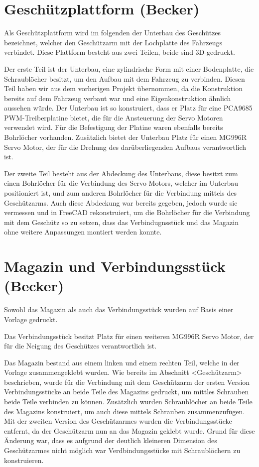 \section{Geschützplattform (Becker)}

Als Geschützplattform wird im folgenden der Unterbau des Geschützes bezeichnet,
welcher den Geschützarm mit der Lochplatte des Fahrzeugs verbindet. Diese Plattform besteht
aus zwei Teilen, beide sind 3D-gedruckt. 

Der erste Teil ist der Unterbau, eine zylindrische Form mit einer 
Bodenplatte, die Schraublöcher besitzt, um den Aufbau mit dem Fahrzeug 
zu verbinden. Diesen Teil haben wir aus dem vorherigen Projekt übernommen, da 
die Konstruktion bereits auf dem Fahrzeug verbaut war und eine Eigenkonstruktion
ähnlich aussehen würde. Der Unterbau ist so konstruiert, dass er Platz für eine
PCA9685 PWM-Treiberplatine bietet, die für die Ansteuerung der Servo Motoren verwendet wird.
Für die Befestigung der Platine waren ebenfalls bereits Bohrlöcher vorhanden. Zusätzlich bietet
der Unterbau Platz für einen MG996R Servo Motor, der für die Drehung des darüberliegenden
Aufbaus verantwortlich ist.

Der zweite Teil besteht aus der Abdeckung
des Unterbaus, diese besitzt zum einen Bohrlöcher für die Verbindung des Servo Motors,
welcher im Unterbau positioniert ist, und zum anderen Bohrlöcher für die Verbindung mittels
des Geschützarms. Auch diese Abdeckung war bereits gegeben, jedoch wurde sie vermessen und
in FreeCAD rekonstruiert, um die Bohrlöcher für die Verbindung mit dem Geschütz so zu setzen,
dass das Verbindugnsstück und das Magazin ohne weitere Anpassungen montiert werden konnte.

\section{Magazin und Verbindungsstück (Becker)}

Sowohl das Magazin als auch das Verbindungsstück wurden auf Basis einer Vorlage gedruckt. 

Das Verbindungsstück besitzt Platz für einen weiteren MG996R Servo Motor, der für die Neigung 
des Geschützes verantwortlich ist. 

Das Magazin bestand aus einem linken und einem rechten Teil, welche in der Vorlage zusammengeklebt wurden.
Wie bereits im Abschnitt <Geschützarm> beschrieben, wurde für die Verbindung mit dem Geschützarm
der ersten Version Verbindungsstücke an beide Teile des Magazins gedruckt, um mittles Schrauben beide Teile
verbinden zu können. Zusätzlich wurden Schraublöcher an beide Teile des Magazins konstruiert, um auch diese mittels Schrauben zusammenzufügen.
Mit der zweiten Version des Geschützarmes wurden die Verbindungsstücke entfernt, da der Geschützarm nun an das Magazin geklebt wurde.
Grund für diese Änderung war, dass es aufgrund der deutlich kleineren Dimension des Geschützarmes nicht möglich war Verdbindungsstücke mit Schraublöchern
zu konstruieren. 

